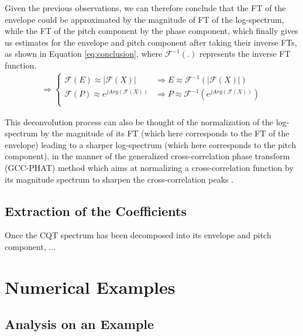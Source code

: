 \documentclass[journal]{IEEEtran}
\begin{document}
Given the previous observations, we can therefore conclude that the FT of the envelope could be approximated by the magnitude of FT of the log-spectrum, while the FT of the pitch component by the phase component, which finally gives us estimates for the envelope and pitch component after taking their inverse FTs, as shown in Equation \ref{eq:conclusion}, where $\mathcal{F}^{-1}(.)$ represents the inverse FT function.
\begin{equation}
\label{eq:conclusion}
\begin{split}
\Rightarrow 
\begin{cases}
\mathcal{F}(E) \approx |\mathcal{F}(X)| &\Rightarrow E \approx \mathcal{F}^{-1}(|\mathcal{F}(X)|) \\
\mathcal{F}(P) \approx e^{j Arg(\mathcal{F}(X))} &\Rightarrow P \approx \mathcal{F}^{-1}(e^{j Arg(\mathcal{F}(X))}) \\
\end{cases}
\end{split}
\end{equation}

This deconvolution process can also be thought of the normalization of the log-spectrum by the magnitude of its FT (which here corresponds to the FT of the envelope) leading to a sharper log-spectrum (which here corresponds to the pitch component), in the manner of the generalized cross-correlation phase transform (GCC-PHAT) method which aims at normalizing a cross-correlation function by its magnitude spectrum to sharpen the cross-correlation peaks \cite{knapp1976}.


\subsection{Extraction of the Coefficients}

Once the CQT spectrum has been decomposed into its envelope and pitch component, ...



\section{Numerical Examples} %

\subsection{Analysis on an Example}

\end{document}
